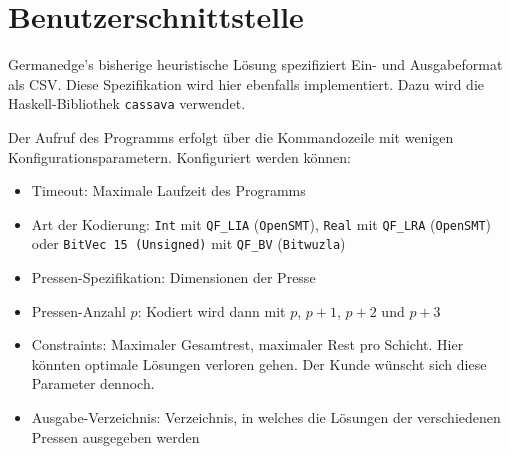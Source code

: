 \section{Benutzerschnittstelle}
Germanedge's bisherige heuristische Lösung spezifiziert Ein- und Ausgabeformat als CSV.
Diese Spezifikation wird hier ebenfalls implementiert.
Dazu wird die Haskell-Bibliothek \texttt{cassava} \cite{cassava} verwendet.

Der Aufruf des Programms erfolgt über die Kommandozeile mit wenigen Konfigurationsparametern.
Konfiguriert werden können:

\begin{itemize}
    \item Timeout: Maximale Laufzeit des Programms
    \item Art der Kodierung: \texttt{Int} mit \texttt{QF\_LIA} (\texttt{OpenSMT}), \texttt{Real} mit \texttt{QF\_LRA} (\texttt{OpenSMT}) oder \texttt{BitVec 15 (Unsigned)} mit \texttt{QF\_BV} (\texttt{Bitwuzla})
    \item Pressen-Spezifikation: Dimensionen der Presse
    \item Pressen-Anzahl $p$: Kodiert wird dann mit $p$, $p+1$, $p+2$ und $p+3$
    \item Constraints: Maximaler Gesamtrest, maximaler Rest pro Schicht. Hier könnten optimale Lösungen verloren gehen. Der Kunde wünscht sich diese Parameter dennoch.
    \item Ausgabe-Verzeichnis: Verzeichnis, in welches die Lösungen der verschiedenen Pressen ausgegeben werden
\end{itemize}

